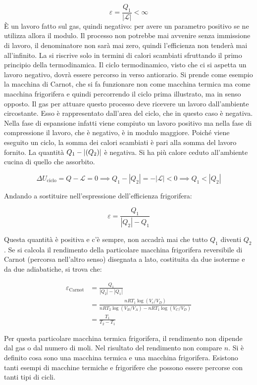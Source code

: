 \[
	\varepsilon = \frac{Q_1 }{|\mathcal{L} |} < \infty
\]
È un lavoro fatto sul gas, quindi negativo: per avere un parametro positivo se ne utilizza allora il modulo.
Il processo non potrebbe mai avvenire senza immissione di lavoro, il denominatore non sarà mai zero, quindi l'efficienza non tenderà mai all'infinito. La si riscrive solo in termini di calori scambiati sfruttando il primo principio della termodinamica. Il ciclo termodinamico, visto che ci si aspetta un lavoro negativo, dovrà essere percorso in verso antiorario.
Si prende come esempio la macchina di Carnot, che si fa funzionare non come macchina termica ma come macchina frigorifera e quindi percorrendo il ciclo prima illustrato, ma in senso opposto.
Il gas per attuare questo processo deve ricevere un lavoro dall'ambiente circostante. Esso è rappresentato dall'area del ciclo, che in questo caso è negativa. Nella fase di espansione infatti viene compiuto un lavoro positivo ma nella fase di compressione il lavoro, che è negativo, è in modulo maggiore.
Poiché viene eseguito un ciclo, la somma dei calori scambiati è pari alla somma del lavoro fornito. La quantità $Q_1 - \lvert(Q_2)\rvert$ è negativa. Si ha più calore ceduto all'ambiente cucina di quello che assorbito.

\[
	\Delta U_{\text{ciclo} } = Q - \mathcal{L}  = 0 \implies Q_1-|Q_2| = -|\mathcal{L}| < 0 \implies Q_1 < |Q_2|
\]

Andando a sostituire nell'espressione dell'efficienza frigorifera:

\[
	\varepsilon = \frac{Q_1 }{|Q_2| - Q_1 }
\]

Questa quantità è positiva e c'è sempre, non accadrà mai che tutto $Q_1$ diventi $Q_2$. Se si calcola il rendimento della particolare macchina frigorifera reversibile di Carnot (percorsa nell'altro senso) disegnata a lato, costituita da due isoterme e da due adiabatiche, si trova che:

\begin{align*}
	\varepsilon_{\text{Carnot} } &= \frac{Q_1 }{|Q_2| - |Q_1|} \\
	&= \frac{nRT_1\log (V_c/V_D  ) }{nRT_2\log (V_B/V_A) - nRT_1\log (V_C/V_D)} \\
	&=\frac{T_1 }{T_2-T_1  }
\end{align*}

Per questa particolare macchina termica frigorifera, il rendimento non dipende dal gas o dal numero di moli. Nel risultato del rendimento non compare $n$. Si è definito cosa sono una macchina termica e una macchina frigorifera. Esistono tanti esempi di macchine termiche e frigorifere che possono essere percorse con tanti tipi di cicli.

